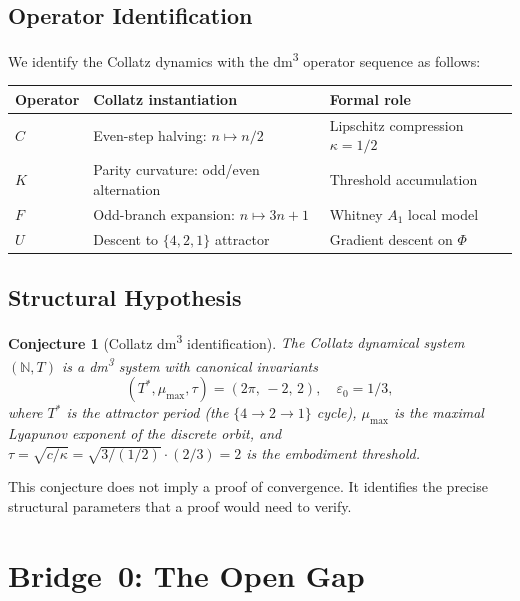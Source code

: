 \documentclass[11pt,a4paper]{article}
\newtheorem{conjecture}[theorem]{Conjecture}
\begin{document}
\subsection{Operator Identification}

We identify the Collatz dynamics with the dm\textsuperscript{3}
operator sequence as follows:

\begin{center}
\begin{tabular}{lll}
\hline
\textbf{Operator} & \textbf{Collatz instantiation} & \textbf{Formal role} \\
\hline
$C$ & Even-step halving: $n \mapsto n/2$ & Lipschitz compression $\kappa = 1/2$ \\
$K$ & Parity curvature: odd/even alternation & Threshold accumulation \\
$F$ & Odd-branch expansion: $n \mapsto 3n+1$ & Whitney $A_1$ local model \\
$U$ & Descent to $\{4,2,1\}$ attractor & Gradient descent on $\Phi$ \\
\hline
\end{tabular}
\end{center}

\subsection{Structural Hypothesis}

\begin{conjecture}[Collatz dm\textsuperscript{3} identification]
The Collatz dynamical system $(\mathbb{N}, T)$ is a dm\textsuperscript{3}
system with canonical invariants
\[
  (T^*, \mu_{\max}, \tau) = (2\pi,\,-2,\,2), \quad \varepsilon_0 = 1/3,
\]
where $T^*$ is the attractor period (the $\{4 \to 2 \to 1\}$ cycle),
$\mu_{\max}$ is the maximal Lyapunov exponent of the discrete orbit,
and $\tau = \sqrt{c/\kappa} = \sqrt{3/(1/2)} \cdot (2/3) = 2$ is the
embodiment threshold.
\end{conjecture}

This conjecture does not imply a proof of convergence.  It identifies
the precise structural parameters that a proof would need to verify.

\section{Bridge~0: The Open Gap}
\end{document}
